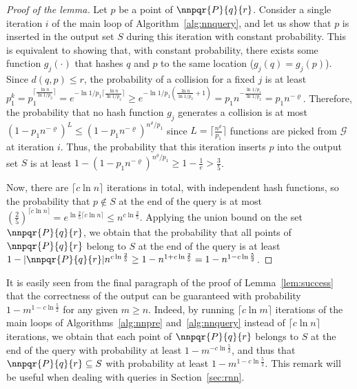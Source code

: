 \begin{proof}[Proof of the lemma]
  Let $p$ be a point of $\nnpqr{P}{q}{r}$. Consider a single iteration
  $i$ of the main loop of Algorithm~\ref{alg:nnquery}, and let us show
  that $p$ is inserted in the output set $S$ during this iteration
  with constant probability.  This is equivalent to showing that, with
  constant probability, there exists some function $g_j(\cdot)$ that
  hashes $q$ and $p$ to the same location ($g_j(q)=g_j(p)$). Since
  $d(q,p)\leq r$, the probability of a collision for a fixed $j$ is at
  least $p_1^k = p_1^{\lceil\frac{\ln n}{\ln 1/p_2}\rceil} =
  e^{-\ln{1/p_1}\lceil\frac{\ln n}{\ln 1/p_2}\rceil} \geq
  e^{-\ln{1/p_1}(\frac{\ln n}{\ln 1/p_2}+1)} = p_1 n^{-\frac{\ln
      1/p_1}{\ln 1/p_2}} = p_1 n^{-\varrho}$. Therefore, the
  probability that no hash function $g_j$ generates a collision is at
  most $(1-p_1 n^{-\varrho})^{L}\leq (1-p_1
  n^{-\varrho})^{n^\varrho/p_1}$ since $L=\lceil
  \frac{n^\varrho}{p_1}\rceil$ functions are picked from $\mathcal{G}$
  at iteration $i$. Thus, the probability that this iteration inserts
  $p$ into the output set $S$ is at least
  $1-(1-p_1n^{-\varrho})^{n^\varrho/p_1} \geq 1 - \frac{1}{e} >
  \frac{3}{5}$.

Now, there are $\lceil c\ln n\rceil$ iterations in total, with
independent hash functions, so the probability that $p\notin S$ at the
end of the query is at most $\left(\frac{2}{5}\right)^{\lceil c\ln
  n\rceil}=e^{\ln\frac{2}{5} \lceil c\ln n\rceil} \leq
n^{c\ln\frac{2}{5}}$. Applying the union bound on the set
$\nnpqr{P}{q}{r}$, we obtain that the probability that all points of
$\nnpqr{P}{q}{r}$ belong to $S$ at the end of the query is at least
$1-|\nnpqr{P}{q}{r}| n^{c\ln\frac{2}{5}}\geq 1-n^{1+c\ln\frac{2}{5}} =
1-n^{1-c\ln\frac{5}{2}}$.
\end{proof}

\begin{remark}\label{rem:increase_n}
It is easily seen from the final paragraph of the proof of
Lemma~\ref{lem:success} that the correctness of the output can be
guaranteed with probability $1-m^{1-c\ln\frac{5}{2}}$ for any given
$m\geq n$. Indeed, by running $\lceil c\ln m\rceil$ iterations of the
main loops of Algorithms~\ref{alg:nnpre} and~\ref{alg:nnquery} instead
of $\lceil c \ln n\rceil$ iterations, we obtain that each point of
$\nnpqr{P}{q}{r}$ belongs to $S$ at the end of the query with probability
at least $1-m^{-c\ln\frac{5}{2}}$, and thus that $\nnpqr{P}{q}{r}\subseteq
S$ with probability at least $1-m^{1-c\ln \frac{5}{2}}$. This
remark will be useful when dealing with \rnn queries in
Section~\ref{sec:rnn}.
\end{remark}

